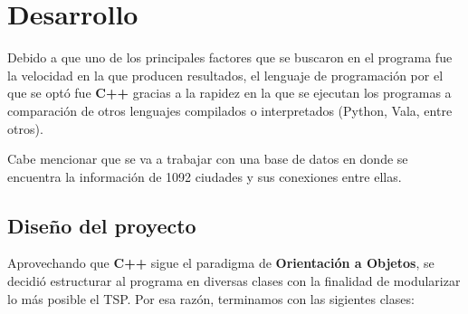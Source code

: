 \documentclass{article}
\newcommand{\tbf}[1]{\textbf{#1}}
\begin{document}
  \section{Desarrollo} \label{development}
  Debido a que uno de los principales factores que se buscaron en el
  programa fue la velocidad en la que producen resultados, el 
  lenguaje de programación por el que se optó fue \tbf{C++} gracias a
  la rapidez en la que se ejecutan los programas a comparación de otros 
  lenguajes compilados o interpretados (Python, Vala, entre otros).

  Cabe mencionar que se va a trabajar con una base de datos en donde 
  se encuentra la información de 1092 ciudades y sus conexiones entre 
  ellas.

  \subsection{Diseño del proyecto}
  Aprovechando que \tbf{C++} sigue el paradigma de \tbf{Orientación a 
  Objetos}, se decidió estructurar al programa en diversas clases con 
  la finalidad de modularizar lo más posible el TSP. Por esa razón,
  terminamos con las sigientes clases:
  
\end{document}
